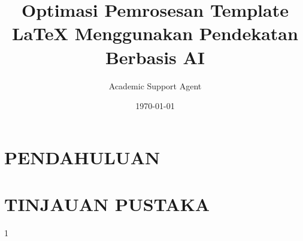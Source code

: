 \documentclass{article}
\title{Optimasi Pemrosesan Template LaTeX Menggunakan Pendekatan Berbasis AI}
\author{Academic Support Agent}
\date{\today}
\begin{document}
\maketitle

\begin{abstract}

\end{abstract}

\chapter{PENDAHULUAN}


\chapter{TINJAUAN PUSTAKA}



\def\OptimizaTikZ{1}



\if\OptimizaTikZ 1
\tikzexternalize[prefix=archivos/figuras-procesadas/] %
\fi 

\newcommand{\titulo}{Título del Trabajo Fin de Grado/Máster}
\newcommand{\subtitulo}{Subtítulo del proyecto}
\newcommand{\miNombre}{Nombre Apellido1 Apellido2 (alumno)}
\newcommand{\miEmail}{nombre@alu.ua.es}
\newcommand{\miTutor}{Nombre Apellido1 Apellido2 (tutor1)}
\newcommand{\miTutorB}{Nombre Apellido1 Apellido2 (tutor2)}
\newcommand{\departamentoTutor}{Departamento del tutor}
\newcommand{\departamentoTutorB}{Departamento del cotutor}
\newcommand{\miFacultad}{Escuela Politécnica Superior}
\newcommand{\miFacultadCorto}{EPS UA}
\newcommand{\miUniversidad}{\protect{Universidad de Alicante}}
\newcommand{\miUbicacion}{Alicante}
\end{document}
